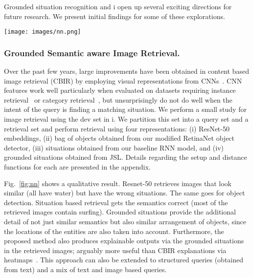 \documentclass[runningheads]{llncs}
\newcommand{\dataset}{\mbox{\sc{SW}}i\mbox{\sc{G}}\xspace}
\begin{document}
\vspace{-2mm}
Grounded situation recognition and \dataset{} open up several exciting directions for future research. We present initial findings for some of these explorations.

\vspace{-4mm}
\begin{figure*}[h!]
\begin{center}
\texttt{[image: images/nn.png]}
\end{center}
\vspace{-5mm}
   \caption{\textbf{Qualitative results for semantic image retrieval}. For the query figure of a surfer in action, ResNet and Object Detection based methods struggle to match the fine semantics. Grounded situation based retrieval leads to the correct semantics with matching viewpoints}
\label{fig:nn}
\vspace{-5mm}
\end{figure*}

\vspace{-5mm}
\subsubsection{Grounded Semantic aware Image Retrieval. }
Over the past few years, large improvements have been obtained in content based image retrieval (CBIR) by employing visual representations from CNNs~\cite{Babenko2014NeuralCF,Radenovi2016CNNIR,Razavian2014VisualIR,Gordo2016DeepIR,Yang2018EfficientIR}. CNN features work well particularly when evaluated on datasets requiring instance retrieval~\cite{Philbin2007ObjectRW} or category retrieval~\cite{imagenet}, but unsurprisingly do not do well when the intent of the query is finding a matching situation. We perform a small study for image retrieval using the dev set in \dataset{}. We partition this set into a query set and a retrieval set and perform retrieval using four representations: (i) ResNet-50 embeddings, (ii) bag of objects obtained from our modified RetinaNet object detector, (iii) situations obtained from our baseline RNN model, and (iv) grounded situations obtained from JSL. Details regarding the setup and distance functions for each are presented in the appendix.

Fig.~\ref{fig:nn} shows a qualitative result. Resnet-50 retrieves images that look similar (all have water) but have the wrong situations. The same goes for object detection. Situation based retrieval gets the semantics correct (most of the retrieved images contain surfing). Grounded situations provide the additional detail of not just similar semantics but also similar arrangement of objects, since the locations of the entities are also taken into account. Furthermore, the proposed method also produces explainable outputs via the grounded situations in the retrieved images; arguably more useful than CBIR explanations via heatmaps~\cite{Dong_2019_CVPR_Workshops}. This approach can also be extended to structured queries (obtained from text) and a mix of text and image based queries.
\end{document}
